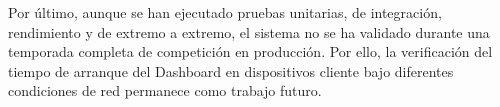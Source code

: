 Por último, aunque se han ejecutado pruebas unitarias, de integración, rendimiento y de extremo a extremo, el sistema no se ha validado durante una temporada completa de competición en producción. Por ello, la verificación del tiempo de arranque del Dashboard en dispositivos cliente bajo diferentes condiciones de red permanece como trabajo futuro.

